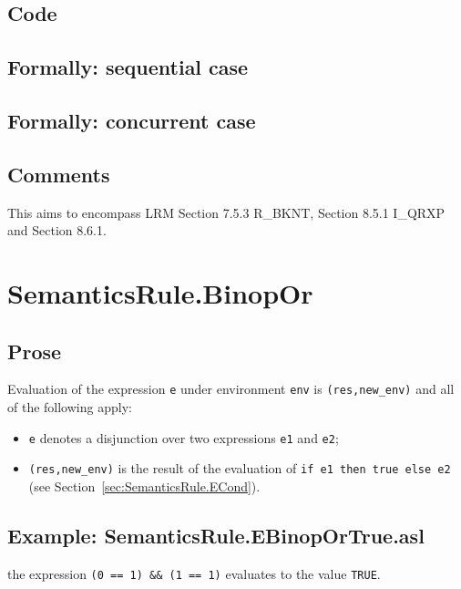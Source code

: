 \documentclass{book}
\begin{document}
  \subsection{Code}

\begin{emptyformal}
  \subsection{Formally: sequential case}

  \subsection{Formally: concurrent case}
\end{emptyformal}

  \subsection{Comments}
  This aims to encompass LRM Section 7.5.3 R\_BKNT, Section 8.5.1 I\_QRXP and Section
  8.6.1.

\section{SemanticsRule.BinopOr \label{sec:SemanticsRule.BinopOr}}
  \subsection{Prose}
  Evaluation of the expression \texttt{e} under environment \texttt{env} is
  \texttt{(res,new\_env)} and all of the following apply:
  \begin{itemize}
  \item \texttt{e} denotes a disjunction over two expressions \texttt{e1} and \texttt{e2};
  \item \texttt{(res,new\_env)} is the result of the evaluation of \texttt{if
e1 then true else e2} (see Section~\ref{sec:SemanticsRule.ECond}).
  \end{itemize}

  \subsection{Example: SemanticsRule.EBinopOrTrue.asl}
    the expression \texttt{(0 == 1) \textbar\textbar \&\& (1 == 1)} evaluates to the value \texttt{TRUE}.
\end{document}
